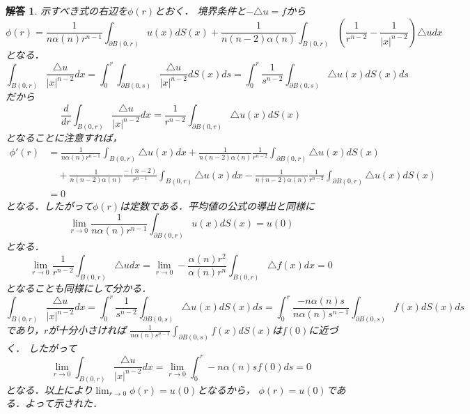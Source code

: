 \documentclass[dvipdfmx,autodetect-engine]{jsarticle}
\newtheorem*{ans}{解答}
\theoremstyle{remark}
\theoremstyle{definition}
\newcommand{\abs}[1]{\left\lvert#1\right\rvert}
\newcommand{\paren}[1]{\left( #1 \right)}
\begin{document}
\begin{ans}
    示すべき式の右辺を$\phi(r)$とおく．
    境界条件と$-\triangle u = f$から
    \begin{equation}
        \phi (r) = \frac{1}{n\alpha(n)r^{n-1}} \int_{\partial B(0,r)} u(x)dS(x) 
        + \frac{1}{n(n-2)\alpha(n)} 
        \int_{B(0,r)} \paren{ \frac{1}{r^{n-2}} - \frac{1}{\abs{x}^{n-2}} }\triangle udx
    \end{equation}
    となる．
    \begin{equation}
        \int_{B(0,r)} \frac{\triangle u}{\abs{x}^{n-2}} dx 
        = \int_{0}^{r} \int_{\partial B(0,s)} \frac{\triangle u}{\abs{x}^{n-2}} dS(x) ds
        = \int_{0}^{r} \frac{1}{s^{n-2}} \int_{\partial B(0,s)} \triangle u(x) dS(x) ds
    \end{equation}
    だから
    \begin{equation}
        \frac{d}{dr} \int_{B(0,r)} \frac{\triangle u}{\abs{x}^{n-2}} dx 
        = \frac{1}{r^{n-2}} \int_{\partial B(0,r)} \triangle u(x) dS(x)
    \end{equation}
    となることに注意すれば，
    \begin{align}
        \phi'(r) &=
        \frac{1}{n\alpha(n)r^{n-1}} \int_{B(0,r)} \triangle u(x)dx
        + \frac{1}{n(n-2)\alpha(n)} \frac{1}{r^{n-2}}
         \int_{\partial B(0,r)} \triangle u(x) dS(x) \\
        &\quad + \frac{1}{n(n-2)\alpha(n)} \frac{-(n-2)}{r^{n-1}} 
        \int_{B(0,r)} \triangle u(x)dx 
        - \frac{1}{n(n-2)\alpha(n)}\frac{1}{r^{n-2}} \int_{\partial B(0,r)} \triangle u(x) dS(x)\\
        &=0
    \end{align}
    となる．したがって$\phi(r)$は定数である．平均値の公式の導出と同様に
    \begin{equation}
        \lim_{r\to 0} \frac{1}{n\alpha(n)r^{n-1}} \int_{\partial B(0,r)} u(x)dS(x) = u(0)
    \end{equation}
    となる．
    \begin{equation}
        \lim_{r\to 0} \frac{1}{r^{n-2}} \int_{B(0,r)} \triangle u dx 
        = \lim_{r \to 0} -\frac{\alpha(n)r^{2}}{\alpha(n)r^{n}} \int_{B(0,r)} \triangle f(x) dx 
        = 0
    \end{equation}
    となることも同様にして分かる．
    \begin{equation}
        \int_{B(0,r)} \frac{\triangle u}{\abs{x}^{n-2}} dx 
        = \int_{0}^{r} \frac{1}{s^{n-2}} \int_{\partial B(0,s)} \triangle u(x) dS(x) ds
        = \int_{0}^{r} \frac{-n\alpha(n)s}{n\alpha(n)s^{n-1}} 
        \int_{\partial B(0,s)} f(x) dS(x) ds
    \end{equation}
    であり，$r$が十分小さければ
    $\frac{1}{n\alpha(n)s^{n-1}} 
    \int_{\partial B(0,s)} f(x) dS(x)$は$f(0)$に近づく．
    したがって
    \begin{equation}
        \lim_{r\to 0} \int_{B(0,r)} \frac{\triangle u}{\abs{x}^{n-2}} dx 
        = \lim_{r\to 0} \int_{0}^{r} -n\alpha(n)s f(0) ds = 0
    \end{equation}
    となる．以上により$\lim_{r\to 0} \phi(r) = u(0)$となるから，
    $\phi(r) = u(0)$である．よって示された．
\end{ans}
\end{document}
